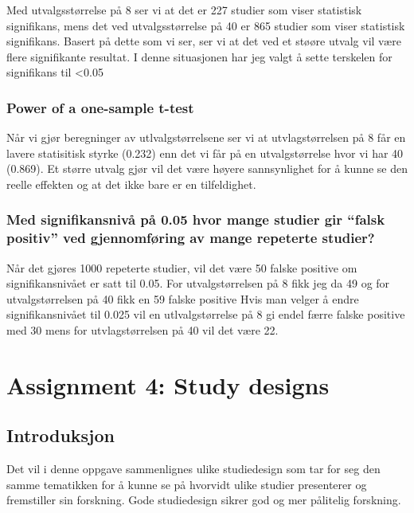 \documentclass[
  letterpaper,
  DIV=11,
  numbers=noendperiod]{scrreprt}
\begin{document}
Med utvalgsstørrelse på 8 ser vi at det er 227 studier som viser
statistisk signifikans, mens det ved utvalgsstørrelse på 40 er 865
studier som viser statistisk signifikans. Basert på dette som vi ser,
ser vi at det ved et støøre utvalg vil være flere signifikante resultat.
I denne situasjonen har jeg valgt å sette terskelen for signifikans til
\textless0.05

\subsection{Power of a one-sample
t-test}\label{power-of-a-one-sample-t-test}

Når vi gjør beregninger av utlvalgstørrelsene ser vi at utvlagstørrelsen
på 8 får en lavere statisitisk styrke (0.232) enn det vi får på en
utvalgstørrelse hvor vi har 40 (0.869). Et større utvalg gjør vil det
være høyere sannsynlighet for å kunne se den reelle effekten og at det
ikke bare er en tilfeldighet.

\subsection{Med signifikansnivå på 0.05 hvor mange studier gir ``falsk
positiv'' ved gjennomføring av mange repeterte
studier?}\label{med-signifikansnivuxe5-puxe5-0.05-hvor-mange-studier-gir-falsk-positiv-ved-gjennomfuxf8ring-av-mange-repeterte-studier}

Når det gjøres 1000 repeterte studier, vil det være 50 falske positive
om signifikansnivået er satt til 0.05. For utvalgstørrelsen på 8 fikk
jeg da 49 og for utvalgstørrelsen på 40 fikk en 59 falske positive Hvis
man velger å endre signifikansnivået til 0.025 vil en utlvalgstørrelse
på 8 gi endel færre falske positive med 30 mens for utvlagstørrelsen på
40 vil det være 22.


\chapter{Assignment 4: Study designs}\label{assignment-4-study-designs}

\section{Introduksjon}\label{introduksjon-3}

Det vil i denne oppgave sammenlignes ulike studiedesign som tar for seg
den samme tematikken for å kunne se på hvorvidt ulike studier
presenterer og fremstiller sin forskning. Gode studiedesign sikrer god
og mer pålitelig forskning.
\end{document}
